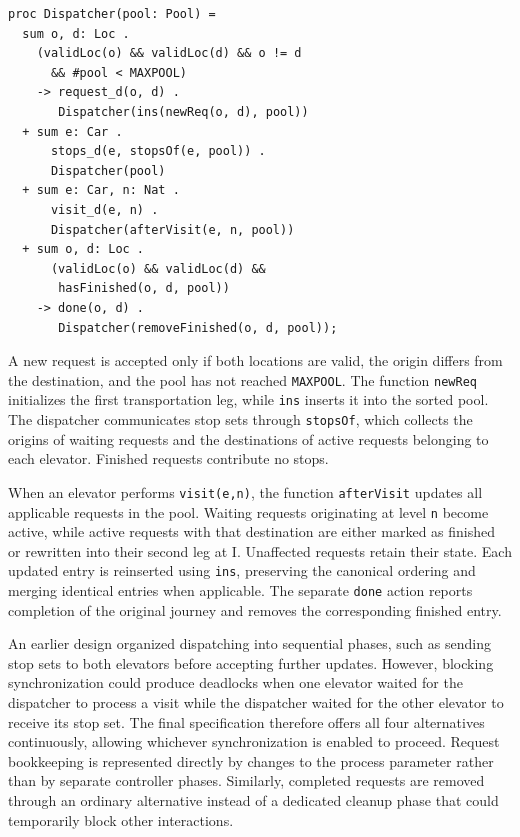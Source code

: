 \begin{lstlisting}
proc Dispatcher(pool: Pool) =
  sum o, d: Loc .
    (validLoc(o) && validLoc(d) && o != d
      && #pool < MAXPOOL)
    -> request_d(o, d) .
       Dispatcher(ins(newReq(o, d), pool))
  + sum e: Car .
      stops_d(e, stopsOf(e, pool)) .
      Dispatcher(pool)
  + sum e: Car, n: Nat .
      visit_d(e, n) .
      Dispatcher(afterVisit(e, n, pool))
  + sum o, d: Loc .
      (validLoc(o) && validLoc(d) &&
       hasFinished(o, d, pool))
    -> done(o, d) .
       Dispatcher(removeFinished(o, d, pool));
\end{lstlisting}

A new request is accepted only if both locations are valid, the origin differs from the destination, and the pool has not reached \texttt{MAXPOOL}. The function \texttt{newReq} initializes the first transportation leg, while \texttt{ins} inserts it into the sorted pool. The dispatcher communicates stop sets through \texttt{stopsOf}, which collects the origins of waiting requests and the destinations of active requests belonging to each elevator. Finished requests contribute no stops.

When an elevator performs \texttt{visit(e,n)}, the function \texttt{afterVisit} updates all applicable requests in the pool. Waiting requests originating at level \texttt{n} become active, while active requests with that destination are either marked as finished or rewritten into their second leg at I. Unaffected requests retain their state. Each updated entry is reinserted using \texttt{ins}, preserving the canonical ordering and merging identical entries when applicable. The separate \texttt{done} action reports completion of the original journey and removes the corresponding finished entry.

An earlier design organized dispatching into sequential phases, such as sending stop sets to both elevators before accepting further updates. However, blocking synchronization could produce deadlocks when one elevator waited for the dispatcher to process a visit while the dispatcher waited for the other elevator to receive its stop set. The final specification therefore offers all four alternatives continuously, allowing whichever synchronization is enabled to proceed. Request bookkeeping is represented directly by changes to the process parameter rather than by separate controller phases. Similarly, completed requests are removed through an ordinary alternative instead of a dedicated cleanup phase that could temporarily block other interactions.

